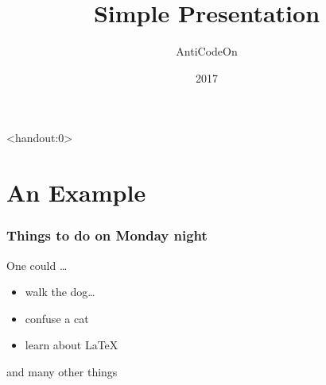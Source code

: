 \documentclass[10pt]{beamer}
\title{Simple Presentation}
\author[A. CodeOn]{AntiCodeOn}
\institute{Home}
\date{2017}
\begin{document}
\begin{frame}<handout:0>
 \titlepage
\end{frame}

\section{An Example}

\begin{frame}
  \frametitle{Things to do on Monday night}
  \begin{block}{One could \ldots}
    \begin{itemize}
     \item walk the dog\dots \pause
     \item confuse a cat\pause
     \item learn about \LaTeX
    \end{itemize}
  \end{block}
  and many other things
\end{frame}
\end{document}
